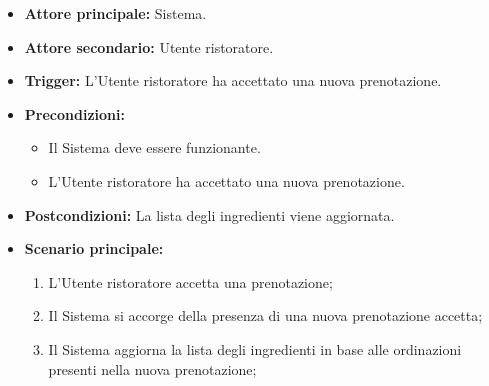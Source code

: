 \label{usecase:Aggiornamento lista ingredienti}
\begin{itemize}
	\item \textbf{Attore principale:} Sistema.
	\item \textbf{Attore secondario:} Utente ristoratore.
	\item \textbf{Trigger:} L'Utente ristoratore ha accettato una nuova prenotazione.

	\item \textbf{Precondizioni:} 
    \begin{itemize}
        \item Il Sistema deve essere funzionante.
        \item L'Utente ristoratore ha accettato una nuova prenotazione.
    \end{itemize} 

	\item \textbf{Postcondizioni:} La lista degli ingredienti viene aggiornata.

	\item \textbf{Scenario principale:}
	      \begin{enumerate}
		      \item L'Utente ristoratore accetta una prenotazione;
		      \item Il Sistema si accorge della presenza di una nuova prenotazione accetta;
		      \item Il Sistema aggiorna la lista degli ingredienti in base alle ordinazioni presenti nella nuova prenotazione;
	      \end{enumerate}
\end{itemize}